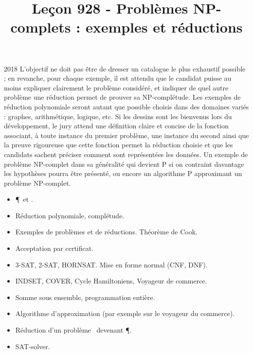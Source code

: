 \documentclass{agregfiche}
\title{Leçon 928 - Problèmes NP-complets : exemples et réductions}
\begin{document}
\maketitle

\secrapports
\begin{rapport}{2018}
    L’objectif ne doit pas être de dresser un catalogue le plus 
    exhaustif possible ; en revanche, pour chaque
    exemple, il est attendu que le candidat puisse au moins expliquer 
    clairement le problème considéré, et
    indiquer de quel autre problème une réduction permet de prouver 
    sa NP-complétude.
    Les exemples de réduction polynomiale seront autant que possible 
    choisis dans des domaines variés :
    graphes, arithmétique, logique, etc. Si les dessins sont les 
    bienvenus lors du développement, le jury
    attend une définition claire et concise de la fonction associant, 
    à toute instance du premier problème,
    une instance du second ainsi que la preuve rigoureuse que cette 
    fonction permet la réduction choisie
    et que les candidats sachent préciser comment sont représentées 
    les données.
    Un exemple de problème NP-complet dans sa généralité qui devient 
    P si on contraint davantage les
    hypothèses pourra être présenté, ou encore un algorithme P 
    approximant un problème NP-complet.
\end{rapport}

\secindispensables

\begin{itemize}
	\item \P\ et \NP.
    \item Réduction polynomiale, complétude.
    \item Exemples de problèmes et de réductions. Théorème de Cook.
\end{itemize}

\secasavoir

\begin{itemize}
    \item Acceptation par certificat.
	\item 3-SAT, 2-SAT, HORNSAT. Mise en forme normal (CNF, DNF).
    \item INDSET, COVER, Cycle Hamiltoniens, Voyageur de commerce.
    \item Somme sous ensemble, programmation entière.
    
\end{itemize}

\secidees

\begin{itemize}
	\item Algorithme d'approximation (par exemple sur le voyageur du 
    commerce).
    \item Réduction d'un problème \NP\ devenant \P.
    \item SAT-solver.
\end{itemize}
\end{document}
